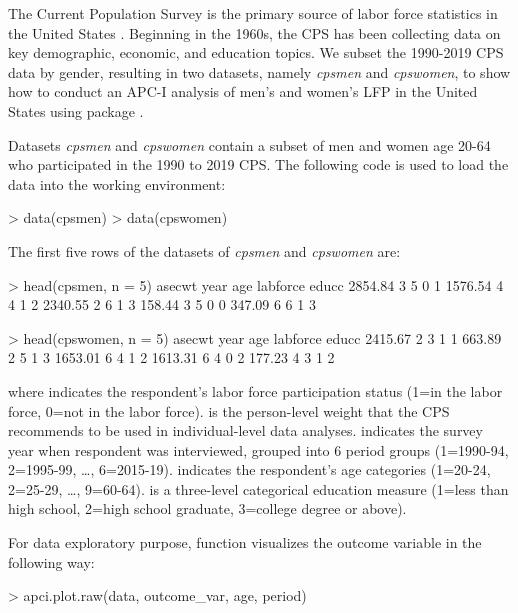 The Current Population Survey \citep[\hyperlink{https://www.census.gov/programs-surveys/cps/data.html}{CPS,}][]{cps_citation} is the primary source of labor force statistics in the United States \citep{cps_citation}. Beginning in the 1960s, the CPS has been collecting data on key demographic, economic, and education topics. We subset the 1990-2019 CPS data by gender, resulting in two datasets, namely \textit{cpsmen} and \textit{cpswomen}, to show how to conduct an APC-I analysis of men's and women's LFP in the United States using package . 

Datasets \textit{cpsmen} and \textit{cpswomen} contain a subset of men and women age 20-64 who participated in the 1990 to 2019 CPS. The following code is used to load the data into the working environment:

\begin{example}
> data(cpsmen)
> data(cpswomen)
\end{example}

The first five rows of the datasets of \textit{cpsmen} and \textit{cpswomen} are: 

\begin{example}
> head(cpsmen, n = 5)
  asecwt year age labforce educc
 2854.84    3   5        0     1
 1576.54    4   4        1     2
 2340.55    2   6        1     3
  158.44    3   5        0     0
  347.09    6   6        1     3

> head(cpswomen, n = 5)
  asecwt year age labforce educc
 2415.67    2   3        1     1
  663.89    2   5        1     3
 1653.01    6   4        1     2
 1613.31    6   4        0     2
  177.23    4   3        1     2
\end{example}
where {} indicates the respondent's labor force participation status (1=in the labor force, 0=not in the labor force). {} is the person-level weight that the CPS recommends to be used in individual-level data analyses. {} indicates the survey year when respondent was interviewed, grouped into 6 period groups (1=1990-94, 2=1995-99, …, 6=2015-19). {} indicates the respondent’s age categories (1=20-24, 2=25-29, …, 9=60-64). {} is a three-level categorical education measure (1=less than high school, 2=high school graduate, 3=college degree or above).  

For data exploratory purpose, function {} visualizes the outcome variable in the following way:
\begin{example}
> apci.plot.raw(data, outcome_var, age, period)
\end{example}

